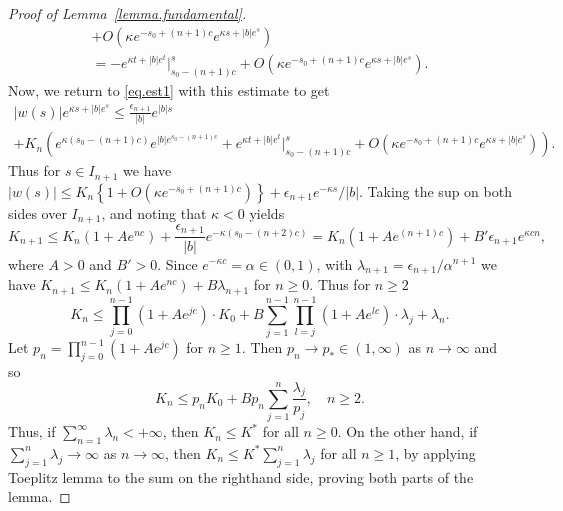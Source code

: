 \documentclass[a4paper,10pt,reqno]{amsart}
\numberwithin{equation}{section}
\theoremstyle{definition}
\theoremstyle{remark}
\DeclareMathOperator{\1}{\mathbbm 1}
\begin{document}
\begin{proof}[Proof of Lemma~\ref{lemma.fundamental}]
\begin{multline*}
	+O\left(\kappa e^{-s_0+(n+1)c} e^{\kappa s+|b|e^s}\right)
	\\= -e^{\kappa t+|b|e^t}\Big|_{s_0-(n+1)c}^s
	+O\left(\kappa e^{-s_0+(n+1)c} e^{\kappa s+|b|e^s}\right).
\end{multline*}
Now, we return to \eqref{eq.est1} with this estimate to get
\begin{multline*} %
	|w(s)| e^{\kappa s+|b|e^s} 
	\leq \frac{\epsilon_{n+1}}{|b|} e^{|b|s} \\
	+ K_n \left(e^{\kappa(s_0-(n+1)c)} e^{|b|e^{s_0-(n+1)c}}
	+e^{\kappa t+|b|e^t}\Big|_{s_0-(n+1)c}^s
	+O\left(\kappa e^{-s_0+(n+1)c} e^{\kappa s+|b|e^s}\right)\right).
\end{multline*}
Thus for $s\in I_{n+1}$ we have 
$|w(s)| \leq K_n \left\{1+O\left(\kappa e^{-s_0+(n+1)c} \right)\right\}
+\epsilon_{n+1} e^{-\kappa s}/|b|$.	Taking the sup on both sides over $I_{n+1}$, and noting that $\kappa<0$ yields
\[
K_{n+1}\leq K_n(1+A e^{nc})+\frac{\epsilon_{n+1}}{|b|} e^{-\kappa (s_0-(n+2)c)}
=K_n(1+A e^{(n+1)c})+B'\epsilon_{n+1}e^{\kappa c n},
\]
where $A>0$ %
and $B'>0$. %
Since $e^{-\kappa c}=\alpha\in (0,1)$, with $\lambda_{n+1}=\epsilon_{n+1}/\alpha^{n+1}$ we have 
$K_{n+1}\leq K_n(1+A e^{nc})+B\lambda_{n+1}$ for $n\geq 0$. Thus for $n\geq 2$ 
\[
K_n\leq \prod_{j=0}^{n-1} (1+Ae^{jc}) \cdot K_0 + B\sum_{j=1}^{n-1} \prod_{l=j}^{n-1} (1+Ae^{lc}) \cdot \lambda_j + \lambda_n.
\]
Let $p_n=\prod_{j=0}^{n-1} (1+Ae^{jc})$ for $n\geq 1$. Then $p_n\to p_\ast\in (1,\infty)$ as $n\to\infty$ and so  
\begin{equation} \label{eq.Knexplicitestimate}
	K_n\leq p_n K_0 + B p_n\sum_{j=1}^n \frac{\lambda_j}{p_j}, \quad n\geq 2. 
\end{equation}
Thus, if $\sum_{n=1}^\infty \lambda_n<+\infty$, then $K_n\leq K^\ast$ for all $n\geq 0$. 
On the other hand, if $\sum_{j=1}^n \lambda_j\to \infty$ as $n\to\infty$, then 
$K_n\leq K^\ast \sum_{j=1}^n \lambda_j$ for all $n\geq 1$, by applying Toeplitz lemma to the sum on the righthand side, proving both parts of the lemma. 


\end{proof}
\end{document}
